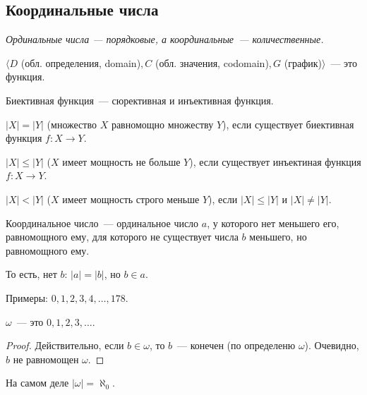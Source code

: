 \subsection{Координальные числа}
\textit{Ординальные числа --- порядковые, а координальные~--- количественные.}
\begin{definition}
    $\langle D$ (обл. определения, domain)$, C$ (обл. значения, codomain)$, G$ (график)$\rangle$~--- это функция.
\end{definition}

\begin{definition}
    Биективная функция~--- сюрективная и инъективная функция.
\end{definition}

\begin{definition}
    $|X| = |Y|$ (множество $X$ равномощно множеству $Y$), если существует биективная функция $f: X \to Y$.
\end{definition}

\begin{definition}
    $|X| \leqslant |Y|$ ($X$ имеет мощность не больше $Y$), если существует инъектиная функция $f: X\to Y$.
\end{definition}

\begin{definition}
    $|X| < |Y|$ ($X$ имеет мощность строго меньше $Y$), если $|X| \leqslant |Y|$ и $|X| \neq |Y|$.
\end{definition}

\begin{definition}
    Координальное число~--- ординальное число $a$, у которого нет меньшего его, равномощного ему, для которого не существует числа $b$ меньшего, но равномощного ему.

    То есть, нет $b$: $|a| = |b|$, но $b \in a$.
\end{definition}

\begin{example}
    Примеры: $0, 1, 2, 3, 4, \dots, 178$.
\end{example}

\begin{statement}
    $\omega$~--- это $0, 1, 2, 3, \dots$.
\end{statement}
\begin{proof}
    Действительно, если $b \in \omega$, то $b$~--- конечен (по определеню $\omega$).
    Очевидно, $b$ не равномощен $\omega$.
\end{proof}

\begin{definition}
    На самом деле $|\omega| = \aleph_0$.
\end{definition}

